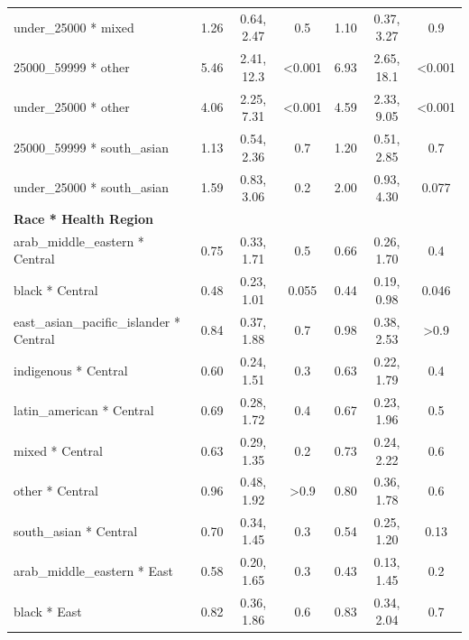\documentclass[
  letterpaper,
  DIV=11,
  numbers=noendperiod]{scrartcl}
\begin{document}
\begin{longtable}{lcccccc}
\hspace{1em}under\_25000 * mixed & 1.26 & 0.64, 2.47 & 0.5 & 1.10 & 0.37, 3.27 & 0.9\\
\hspace{1em}25000\_59999 * other & 5.46 & 2.41, 12.3 & <0.001 & 6.93 & 2.65, 18.1 & <0.001\\
\hspace{1em}under\_25000 * other & 4.06 & 2.25, 7.31 & <0.001 & 4.59 & 2.33, 9.05 & <0.001\\
\hspace{1em}25000\_59999 * south\_asian & 1.13 & 0.54, 2.36 & 0.7 & 1.20 & 0.51, 2.85 & 0.7\\
\hspace{1em}under\_25000 * south\_asian & 1.59 & 0.83, 3.06 & 0.2 & 2.00 & 0.93, 4.30 & 0.077\\
\textbf{Race * Health Region} &  &  &  &  &  & \\
\hspace{1em}arab\_middle\_eastern * Central & 0.75 & 0.33, 1.71 & 0.5 & 0.66 & 0.26, 1.70 & 0.4\\
\hspace{1em}black * Central & 0.48 & 0.23, 1.01 & 0.055 & 0.44 & 0.19, 0.98 & 0.046\\
\hspace{1em}east\_asian\_pacific\_islander * Central & 0.84 & 0.37, 1.88 & 0.7 & 0.98 & 0.38, 2.53 & >0.9\\
\hspace{1em}indigenous * Central & 0.60 & 0.24, 1.51 & 0.3 & 0.63 & 0.22, 1.79 & 0.4\\
\hspace{1em}latin\_american * Central & 0.69 & 0.28, 1.72 & 0.4 & 0.67 & 0.23, 1.96 & 0.5\\
\hspace{1em}mixed * Central & 0.63 & 0.29, 1.35 & 0.2 & 0.73 & 0.24, 2.22 & 0.6\\
\hspace{1em}other * Central & 0.96 & 0.48, 1.92 & >0.9 & 0.80 & 0.36, 1.78 & 0.6\\
\hspace{1em}south\_asian * Central & 0.70 & 0.34, 1.45 & 0.3 & 0.54 & 0.25, 1.20 & 0.13\\
\hspace{1em}arab\_middle\_eastern * East & 0.58 & 0.20, 1.65 & 0.3 & 0.43 & 0.13, 1.45 & 0.2\\
\hspace{1em}black * East & 0.82 & 0.36, 1.86 & 0.6 & 0.83 & 0.34, 2.04 & 0.7\\

\end{longtable}
\end{document}
